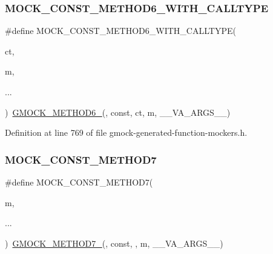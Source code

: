 \subsubsection{\texorpdfstring{M\+O\+C\+K\+\_\+\+C\+O\+N\+S\+T\+\_\+\+M\+E\+T\+H\+O\+D6\+\_\+\+W\+I\+T\+H\+\_\+\+C\+A\+L\+L\+T\+Y\+PE}{MOCK\_CONST\_METHOD6\_WITH\_CALLTYPE}}
{\footnotesize\ttfamily \#define M\+O\+C\+K\+\_\+\+C\+O\+N\+S\+T\+\_\+\+M\+E\+T\+H\+O\+D6\+\_\+\+W\+I\+T\+H\+\_\+\+C\+A\+L\+L\+T\+Y\+PE(\begin{DoxyParamCaption}\item[{}]{ct,  }\item[{}]{m,  }\item[{}]{... }\end{DoxyParamCaption})~\hyperlink{gmock-generated-function-mockers_8h_ad0ca7f6973a076d0af4c953f8ed91842}{G\+M\+O\+C\+K\+\_\+\+M\+E\+T\+H\+O\+D6\+\_\+}(, const, ct, m, \+\_\+\+\_\+\+V\+A\+\_\+\+A\+R\+G\+S\+\_\+\+\_\+)}



Definition at line 769 of file gmock-\/generated-\/function-\/mockers.\+h.

\mbox{\label{gmock-generated-function-mockers_8h_a0f0e63ed14beab1d85f0160bdbed9930}} 
\subsubsection{\texorpdfstring{M\+O\+C\+K\+\_\+\+C\+O\+N\+S\+T\+\_\+\+M\+E\+T\+H\+O\+D7}{MOCK\_CONST\_METHOD7}}
{\footnotesize\ttfamily \#define M\+O\+C\+K\+\_\+\+C\+O\+N\+S\+T\+\_\+\+M\+E\+T\+H\+O\+D7(\begin{DoxyParamCaption}\item[{}]{m,  }\item[{}]{... }\end{DoxyParamCaption})~\hyperlink{gmock-generated-function-mockers_8h_ab98a8399ba62b53b375c2807f4d39d2f}{G\+M\+O\+C\+K\+\_\+\+M\+E\+T\+H\+O\+D7\+\_\+}(, const, , m, \+\_\+\+\_\+\+V\+A\+\_\+\+A\+R\+G\+S\+\_\+\+\_\+)}




